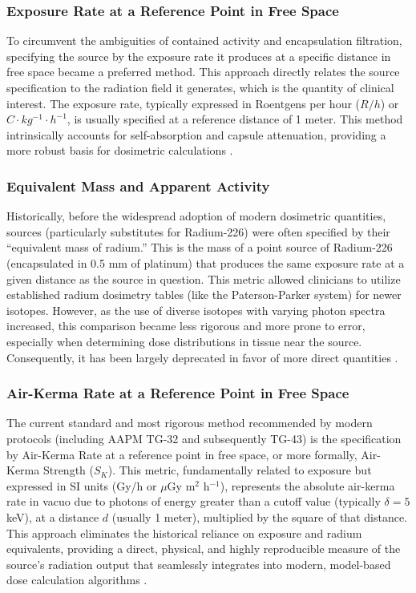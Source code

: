 \subsubsection{Exposure Rate at a Reference Point in Free Space}
To circumvent the ambiguities of contained activity and encapsulation filtration, specifying the source by the exposure rate it produces at a specific distance in free space became a preferred method. This approach directly relates the source specification to the radiation field it generates, which is the quantity of clinical interest. The exposure rate, typically expressed in Roentgens per hour ($R/h$) or $C \cdot kg^{-1} \cdot h^{-1}$, is usually specified at a reference distance of 1 meter. This method intrinsically accounts for self-absorption and capsule attenuation, providing a more robust basis for dosimetric calculations \cite{aapm1987report21}.

\subsubsection{Equivalent Mass and Apparent Activity}
Historically, before the widespread adoption of modern dosimetric quantities, sources (particularly substitutes for Radium-226) were often specified by their ``equivalent mass of radium.'' This is the mass of a point source of Radium-226 (encapsulated in 0.5 mm of platinum) that produces the same exposure rate at a given distance as the source in question. This metric allowed clinicians to utilize established radium dosimetry tables (like the Paterson-Parker system) for newer isotopes. However, as the use of diverse isotopes with varying photon spectra increased, this comparison became less rigorous and more prone to error, especially when determining dose distributions in tissue near the source. Consequently, it has been largely deprecated in favor of more direct quantities \cite{aapm1987report21}.

\subsubsection{Air-Kerma Rate at a Reference Point in Free Space}
The current standard and most rigorous method recommended by modern protocols (including AAPM TG-32 and subsequently TG-43) is the specification by Air-Kerma Rate at a reference point in free space, or more formally, Air-Kerma Strength ($S_K$). This metric, fundamentally related to exposure but expressed in SI units (Gy/h or $\mu$Gy m$^2$ h$^{-1}$), represents the absolute air-kerma rate in vacuo due to photons of energy greater than a cutoff value (typically $\delta = 5$ keV), at a distance $d$ (usually 1 meter), multiplied by the square of that distance. This approach eliminates the historical reliance on exposure and radium equivalents, providing a direct, physical, and highly reproducible measure of the source's radiation output that seamlessly integrates into modern, model-based dose calculation algorithms \cite{aapm1987report21}.

